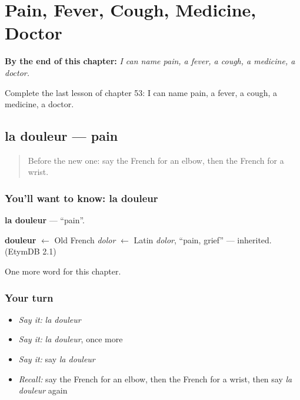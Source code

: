 
\chapter{Pain, Fever, Cough, Medicine, Doctor}
\label{ch:fr-pain-fever-cough-medicine-doctor}

\begin{chapteropening}
\textbf{By the end of this chapter:} \emph{I can name pain, a fever, a cough, a medicine, a doctor.}

Complete the last lesson of chapter 53: I can name pain, a fever, a cough, a medicine, a doctor.
\end{chapteropening}

\section[la douleur]{la douleur — pain}

\label{lesson:FR-C53-douleur}



\begin{quote}
Before the new one: say the French for an elbow, then the French for a wrist.
\end{quote}

\subsection*{You'll want to know: la douleur}
\textbf{la douleur} — \textquotedblleft{}pain\textquotedblright{}.

\begin{cousinweb}
\textbf{douleur} $\leftarrow$ Old French \emph{dolor} $\leftarrow$ Latin \emph{dolor}, \textquotedblleft{}pain, grief\textquotedblright{} — inherited. (EtymDB 2.1)
\end{cousinweb}

\begin{grammarlens}[title={What you've built}]
One more word for this chapter.
\end{grammarlens}

\subsection*{Your turn}
\begin{itemize}
\raggedright
  \item \emph{Say it:} \emph{la douleur}
  \item \emph{Say it:} \emph{la douleur}, once more
  \item \emph{Say it:} say \emph{la douleur}
  \item \emph{Recall:} say the French for an elbow, then the French for a wrist, then say \emph{la douleur} again
\end{itemize}

